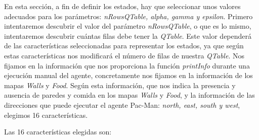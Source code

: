 \documentclass[11pt]{exam}
\begin{document}
En esta sección, a fin de definir los estados, hay que seleccionar unos valores adecuados para los parámetros: \textit{nRowsQTable, alpha, gamma y epsilon}. Primero intentaremos descubrir el valor del parámetro \textit{nRowsQTable}, o que es lo mismo, intentaremos descubrir cuántas filas debe tener la \textit{QTable}. Este valor dependerá de las características seleccionadas para representar los estados, ya que según estas características nos modificará el número de filas de nuestra \textit{QTable}. Nos fijamos en la información que nos proporciona la función \textit{printInfo} durante una ejecución manual del agente, concretamente nos fijamos en la información de los mapas \textit{Walls} y \textit{Food}. Según esta información, que nos indica la presencia y ausencia de paredes y comida en los mapas \textit{Walls} y \textit{Food}, y la información de las direcciones que puede ejecutar el agente Pac-Man: \textit{north, east, south y west}, elegimos 16 características.

\newpage

Las 16 características elegidas son:

\begin{parcolumns}{2}
	\colplacechunks
\end{parcolumns}
\vspace*{3mm}
\end{document}
